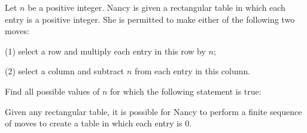 Let $n$ be a positive integer. Nancy is given a rectangular table in which each entry is a positive integer.  She is permitted to make either of the following two moves:

(1)  select a row and multiply each entry in this row by $n$;

(2)  select a column and subtract $n$ from each entry in this column.

Find all possible values of $n$ for which the following statement is true:

Given any rectangular table, it is possible for Nancy to perform a finite sequence of moves to create a table in which each entry is $0$.